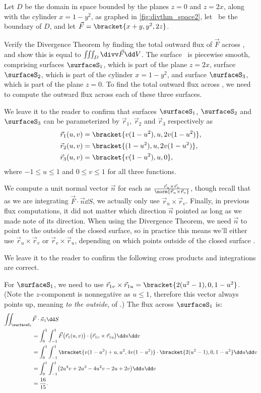 \begin{example}\label{ex_divthm_space2}%
Let $D$ be the domain in space bounded by the planes $z=0$ and $z=2x$, along with the cylinder $x=1-y^2$, as graphed in \autoref{fig:divthm_space2}, let \surfaceS\ be the boundary of $D$, and let $\vec F =\bracket{x+y,y^2, 2z}$. 

Verify the Divergence Theorem by finding the total outward flux of $\vec F$ across \surfaceS, and show this is equal to $\iiint_D \divv\vec F\dd V$.
\solution
The surface \surfaceS\ is piecewise smooth, comprising surfaces $\surfaceS_1$, which is part of the plane $z=2x$, surface $\surfaceS_2$, which is part of the cylinder $x=1-y^2$, and surface $\surfaceS_3$, which is part of the plane $z=0$. To find the total outward flux across \surfaceS, we need to compute the outward flux across each of these three surfaces.

We leave it to the reader to confirm that surfaces $\surfaceS_1$, $\surfaceS_2$ and $\surfaceS_3$ can be parameterized by $\vec r_1$, $\vec r_2$ and $\vec r_3$ respectively as
\begin{align*}
\vec r_1(u,v) &=\bracket{v(1-u^2), u, 2v(1-u^2)}, \\
\vec r_2(u,v) &=\bracket{(1-u^2), u, 2v(1-u^2)},\\
\vec r_3(u,v) &=\bracket{v(1-u^2), u, 0},
\end{align*}
where $-1\leq u\leq 1$ and $0\leq v\leq 1$ for all three functions.

We compute a unit normal vector $\vec n$ for each as $\frac{\vec r_u\times\vec r_v}{\norm{\vec r_u\times\vec r_v}}$, though recall that as we are integrating $\vec F\cdot \vec n\dd S$, we actually only use $\vec r_u\times\vec r_v$. Finally, in previous flux computations, it did not matter which direction $\vec n$ pointed as long as we made note of its direction. When using the Divergence Theorem, we need $\vec n$ to point to the outside of the closed surface, so in practice this means we'll either use $\vec r_u\times\vec r_v$ or $\vec r_v\times\vec r_u$, depending on which points outside of the closed surface \surfaceS.

We leave it to the reader to confirm the following cross products and integrations are correct.

For $\surfaceS_1$, we need to use $\vec r_{1v}\times\vec r_{1u} =\bracket{2(u^2-1),0,1-u^2}$. (Note the $z$-component is nonnegative as $u\leq 1$, therefore this vector always points up, meaning \emph{to the outside}, of \surfaceS.) The flux across $\surfaceS_1$ is:
\begin{align*}
	\iint_{\surfaceS_1} &\vec F\cdot \vec n_1\dd S
	 \\
	&= \int_0^1\int_{-1}^1 \vec F\bigl(\vec r_1(u,v)\bigr)\cdot \bigl(\vec r_{1v}\times\vec r_{1u}\bigr)\dd u\dd v\\
	&= \int_0^1\int_{-1}^1\bracket{v(1-u^2)+u, u^2,4v(1-u^2)}\cdot\bracket{2(u^2-1),0,1-u^2}\dd u\dd v\\
	&= \int_0^1\int_{-1}^1 \bigl(2u^4v+2u^3-4u^2v-2u+2v\bigr)\dd u\dd v\\
	&= \frac{16}{15}.
\end{align*}


\end{example}
